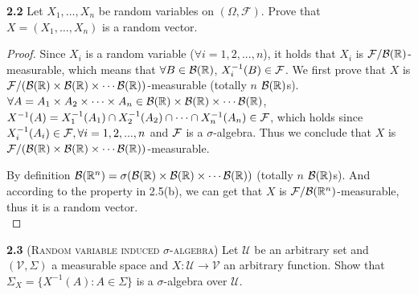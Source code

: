 
\noindent\textbf{2.2}
Let $X_1,\dots,X_n$ be random variables on $(\Omega, \mathcal{F})$. Prove that $X=( X_1 ,\dots,X_n )$ is a random vector.
\begin{proof}
    Since $X_i$ is a random variable ($\forall i=1,2,...,n$), it holds that $X_i$ is $\mathcal{F}/\mathcal{B}(\mathbb{R})$-measurable, which means that $\forall B \in \mathcal{B}(\mathbb{R})$, $X_i^{-1}(B) \in \mathcal{F}$.
    We first prove that $X$ is $\mathcal{F}/(\mathcal{B}(\mathbb{R}) \times \mathcal{B}(\mathbb{R})\times\cdots \mathcal{B}(\mathbb{R}) )$-measurable (totally $n$ $\mathcal{B}(\mathbb{R})$s). $\forall A=A_1\times A_2 \times \cdots \times A_n  \in \mathcal{B}(\mathbb{R}) \times \mathcal{B}(\mathbb{R})\times\cdots \mathcal{B}(\mathbb{R})$, $X^{-1}(A) =X_1^{-1}(A_1) \cap X_2^{-1}(A_2) \cap \cdots \cap X_n^{-1}(A_n) \in \mathcal{F}$, which holds since $X_i^{-1}(A_i) \in \mathcal{F}, \forall i =1,2,...,n$ and $\mathcal{F}$ is a $\sigma$-algebra. Thus we conclude that $X$ is $\mathcal{F}/(\mathcal{B}(\mathbb{R}) \times \mathcal{B}(\mathbb{R})\times\cdots \mathcal{B}(\mathbb{R}) )$-measurable.

    By definition $\mathcal{B}(\mathbb{R}^n) = \sigma (\mathcal{B}(\mathbb{R}) \times \mathcal{B}(\mathbb{R})\times\cdots \mathcal{B}(\mathbb{R}))$ (totally $n$ $\mathcal{B}(\mathbb{R})$s). And according to the property in 2.5(b), we can get that $X$ is $\mathcal{F}/\mathcal{B}(\mathbb{R}^n)$-measurable, thus it is a random vector.\\
\end{proof}


\noindent\textbf{2.3}
(\textsc{Random variable induced $\sigma$-algebra}) Let $\mathcal{U}$ be an arbitrary set and
$( \mathcal{V}, \Sigma)$ a measurable space and $X : \mathcal{U} \rightarrow \mathcal{V}$ an arbitrary function. Show that
$\Sigma_X = \{X ^{-1} (A) : A \in \Sigma\}$ is a $\sigma$-algebra over $\mathcal{U}$.


